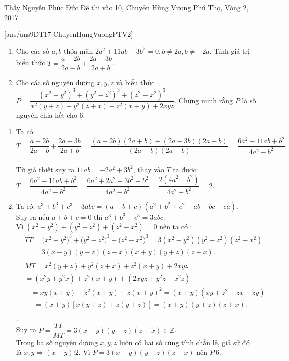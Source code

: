 \begin{name}
{Thầy  Nguyễn Phúc Đức}
{Đề thi vào 10, Chuyên Hùng Vương Phú Thọ, Vòng 2, 2017}
\end{name}
\setcounter{ex}{0}
[ans/ans9DT17-ChuyenHungVuongPTV2]
\begin{ex}%
    \hfill
   \begin{enumerate}
        \item  Cho các số $a, b$ thỏa mãn $2a^2+11ab-3b^2=0, b\ne 2a, b\ne -2a$. Tính giá trị biểu thức
        $T=\dfrac{a-2b}{2a-b}+\dfrac{2a-3b}{2a+b}$.
        \item Cho các số nguyên dương $x, y, z$  và biểu thức 
        $P=\dfrac{(x^2-y^2)^3+(y^2-z^2)^3+(z^2-x^2)^3}{x^2(y+z)+y^2(z+x)+z^2(x+y)+2xyz}$. 
    Chứng minh rằng $P$ là số nguyên chia hết cho $6$.
    \end{enumerate}
\loigiai
    {
    \begin{enumerate}
        \item Ta có: \\
        $T=\dfrac{a-2b}{2a-b}+\dfrac{2a-3b}{2a+b}=\dfrac{(a-2b)(2a+b)+(2a-3b)(2a-b)}{(2a-b)(2a+b)}=\dfrac{6a^2-11ab+b^2}{4a^2-b^2}$.\\
        Từ giả thiết suy ra $11ab=-2a^2+3b^2$, thay vào $T$ ta được: \\
        $T=\dfrac{6a^2-11ab+b^2}{4a^2-b^2}=\dfrac{6a^2+2a^2-3b^2+b^2}{4a^2-b^2}=\dfrac{2(4a^2-b^2)}{4a^2-b^2}=2$. 
       \item Ta có: $a^3+b^3+c^3-3abc=(a+b+c)(a^2+b^2+c^2-ab-bc-ca)$.\\
       Suy ra nếu $a+b+c=0$ thì $a^3+b^3+c^3=3abc$.\\
       Vì $(x^2-y^2)+(y^2-z^2)+(z^2-x^2)=0$ nên ta có : \\ $\begin{aligned}
       & TT={({x^2-y^2)}^3}+{({y^2-z^2)}^3}+{({z^2-x^2)}^3}=3(x^2-y^2)(y^2-z^2)(z^2-x^2) \\ 
       & \ \ \ \ \ =3(x-y)(y-z)(z-x)(x+y)(y+z)(z+x). \\ 
       \end{aligned}$\\
       $\begin{aligned}
       & MT=x^2(y+z)+y^2(z+x)+z^2(x+y)+2xyz \\ 
       & =(x^2y+y^2x)+z^2(x+y)+(2xyz+y^2z+x^2z) \\ 
       & \ \ \ \ =xy(x+y)+z^2(x+y)+z{(x+y)}^2=(x+y)(xy+z^2+zx+zy) \\ 
       & \ \ \ \ \ \ =(x+y)\left[x(y+z)+z(y+z)\right]=(x+y)(y+z)(z+x). \\ 
       \end{aligned}$.\\
       Suy ra $P=\dfrac{TT}{MT}=3(x-y)(y-z)(z-x)\in \mathbb{Z}$.\\ Trong ba số nguyên dương $x, y, z$ luôn có hai số cùng tính chẵn lẻ, giả sử đó là $x, y\Rightarrow (x-y)\vdots 2$. Vì $P=3(x-y)(y-z)(z-x)$ nên $P\vdots 6$. 
    \end{enumerate}
    }
\end{ex}

